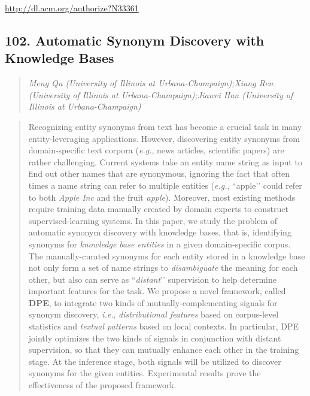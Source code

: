 \documentclass{article}
\begin{document}
\href{http://dl.acm.org/authorize?N33361}{http://dl.acm.org/authorize?N33361}

\subsection{102. Automatic Synonym Discovery with Knowledge Bases}

\begin{quote}
\footnotesize{\textit{Meng Qu (University of Illinois at Urbana-Champaign);Xiang Ren (University of Illinois at Urbana-Champaign);Jiawei Han (University of Illinois at Urbana-Champaign)}}

\end{quote}

\begin{quote}
Recognizing entity synonyms from text has become a crucial task in many entity-leveraging applications. However, discovering entity synonyms from domain-specific text corpora (\textit{e.g.}, news articles, scientific papers) are rather challenging. Current systems take an entity name string as input to find out other names that are synonymous, ignoring the fact that often times a name string can refer to multiple entities (\textit{e.g.}, ``apple’’ could refer to both \textit{Apple Inc} and the fruit \textit{apple}). Moreover, most existing methods require training data manually created by domain experts to construct supervised-learning systems. In this paper, we study the problem of automatic synonym discovery with knowledge bases, that is, identifying synonyms for \textit{knowledge base entities} in a given domain-specific corpus. The manually-curated synonyms for each entity stored in a knowledge base not only form a set of name strings to \textit{disambiguate} the meaning for each other, but also can serve as ``\textit{distant}’’ supervision to help determine important features for the task. We propose a novel framework, called \textbf{DPE}, to integrate two kinds of mutually-complementing signals for synonym discovery, \textit{i.e.}, \textit{distributional features} based on corpus-level statistics and \textit{textual patterns} based on local contexts. In particular, DPE jointly optimizes the two kinds of signals in conjunction with distant supervision, so that they can mutually enhance each other in the training stage. At the inference stage, both signals will be utilized to discover synonyms for the given entities. Experimental results prove the effectiveness of the proposed framework.
\end{quote}
\end{document}
